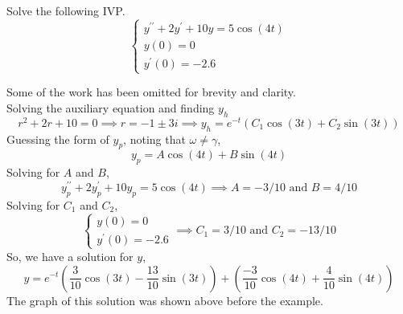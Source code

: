 \begin{example}
	Solve the following IVP.
	\begin{equation*}
		\begin{cases}
			y^{\prime\prime} + 2y^{\prime} + 10y = 5\cos{(4t)} \\
			y(0) = 0 \\
			y^\prime(0) = -2.6
		\end{cases}
	\end{equation*}
\end{example}
\noindent
Some of the work has been omitted for brevity and clarity.\\

\noindent
Solving the auxiliary equation and finding $y_h$
\begin{equation*}
	r^2+2r+10=0 \implies r = -1\pm 3i \implies y_h = e^{-t}\left(C_1\cos{(3t) + C_2\sin{(3t)}}\right)
\end{equation*}
Guessing the form of $y_p$, noting that $\omega \neq \gamma$,
\begin{equation*}
	y_p = A\cos{(4t)} + B\sin{(4t)}
\end{equation*}
Solving for $A$ and $B$,
\begin{equation*}
	y_p^{\prime\prime}+2y_p^\prime+10y_p = 5\cos{(4t)} \implies A=-3/10 \text{ and } B=4/10
\end{equation*}
Solving for $C_1$ and $C_2$,
\begin{equation*}
	\begin{cases}
		y(0) = 0 \\
		y^\prime(0) = -2.6
	\end{cases} \implies C_1 = 3/10 \text{ and } C_2=-13/10
\end{equation*}
So, we have a solution for $y$,
\begin{equation*}
	y = e^{-t}\left(\frac{3}{10}\cos{(3t)}-\frac{13}{10}\sin{(3t)}\right) + \left(\frac{-3}{10}\cos{(4t)}+\frac{4}{10}\sin{(4t)}\right)
\end{equation*}
The graph of this solution was shown above before the example.